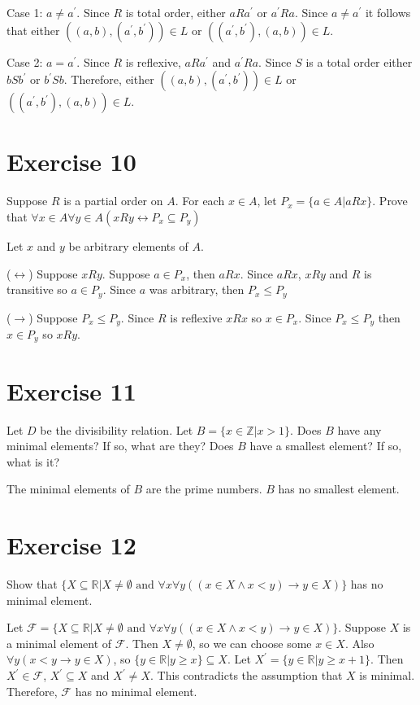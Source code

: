 \documentclass[11pt]{article}
\newcommand{\then}{\rightarrow}
\newcommand{\bicond}{\leftrightarrow}
\newcommand{\family}[1]{\mathcal{#1}}
\begin{document}
Case 1: $a \neq a^\prime$. Since $R$ is total order, either $aRa^\prime$ or 
$a^\prime Ra$. Since $a \neq a^\prime$ it follows that either 
$((a,b), (a^\prime, b^\prime)) \in L$ or $((a^\prime, b^\prime), (a,b)) \in L$.

Case 2: $a = a^\prime$. Since $R$ is reflexive, $aRa^\prime$ and $a^\prime Ra$.
Since $S$ is a total order either $bSb^\prime$ or $b^\prime Sb$. Therefore,
either $((a,b), (a^\prime, b^\prime)) \in L$ or $((a^\prime, b^\prime),(a,b)) \in L$.

\section*{Exercise 10}

Suppose $R$ is a partial order on $A$. For each $x \in A$, let 
$P_x = \{a \in A | aRx\}$. Prove that 
$\forall x \in A \forall y \in A (xRy \bicond P_x \subseteq P_y)$

Let $x$ and $y$ be arbitrary elements of $A$. 

($\leftrightarrow$) Suppose $xRy$. Suppose $a \in P_x$, then $aRx$. Since 
$aRx$, $xRy$ and $R$ is transitive so $a \in P_y$. Since $a$ was arbitrary,
then $P_x \leq P_y$

($\rightarrow$) Suppose $P_x \leq P_y$. Since $R$ is reflexive $xRx$ so 
$x \in P_x$. Since $P_x \leq P_y$ then $x \in P_y$ so $xRy$.

\section*{Exercise 11}

Let $D$ be the divisibility relation. Let $B = \{x \in \mathbb{Z} | x > 1\}$. 
Does $B$ have any minimal elements? If so, what are they? Does $B$ have a 
smallest element? If so, what is it?

The minimal elements of $B$ are the prime numbers. $B$ has no smallest element.

\section*{Exercise 12}

Show that $\{X \subseteq \mathbb{R} | X \neq \emptyset \text{ and } \forall x \forall y ((x \in X \wedge x < y) \then y \in X) \}$
has no minimal element.

Let $\family{F} = \{X \subseteq \mathbb{R} | X \neq \emptyset \text{ and } \forall x \forall y ((x \in X \wedge x < y) \then y \in X) \}$.
Suppose $X$ is a minimal element of $\family{F}$. Then $X \neq \emptyset$, so 
we can choose some $x \in X$. Also $\forall y (x < y \then y \in X)$, so 
$\{y \in \mathbb{R} | y \geq x\} \subseteq X$. Let 
$X^\prime = \{y \in \mathbb{R} | y \geq x + 1 \}$. Then $X^\prime \in \family{F}$,
$X^\prime \subseteq X$ and $X^\prime \neq X$. This contradicts the assumption that 
$X$ is minimal. Therefore, $\family{F}$ has no minimal element. 
\end{document}
